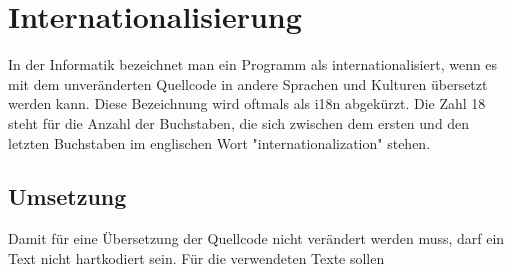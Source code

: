 \chapter{Internationalisierung}
In der Informatik bezeichnet man ein Programm als internationalisiert, wenn es mit dem unveränderten Quellcode in andere Sprachen und Kulturen übersetzt werden kann. Diese Bezeichnung wird oftmals als i18n abgekürzt. Die Zahl 18 steht für die Anzahl der Buchstaben, die sich zwischen dem ersten und den letzten Buchstaben im englischen Wort "internationalization" stehen. \autocite{wikii18n}
\section{Umsetzung}
Damit für eine Übersetzung der Quellcode nicht verändert werden muss, darf ein Text nicht hartkodiert sein. Für die verwendeten Texte sollen 